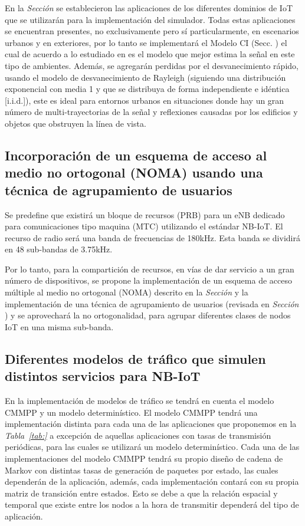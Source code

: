 En la \textit{Sección } se establecieron las aplicaciones de los diferentes dominios de IoT que se utilizarán para la implementación del simulador. Todas estas aplicaciones se encuentran presentes, no exclusivamente pero sí particularmente, en escenarios urbanos y en exteriores, por lo tanto se implementará el Modelo CI (Secc. ) el cual de acuerdo a lo estudiado en \parencite{Sun2016} es el modelo que mejor estima la señal en este tipo de ambientes. Además, se agregarán perdidas por el desvanecimiento rápido, usando el modelo de desvanecimiento de Rayleigh (siguiendo una distribución exponencial con media 1 y que se distribuya de forma independiente e idéntica [i.i.d.]), este es ideal para entornos urbanos en situaciones donde hay un gran número de multi-trayectorias de la señal y reflexiones causadas por los edificios y objetos que obstruyen la línea de vista. \newline

\subsection{Incorporación de un esquema de acceso al medio no ortogonal (NOMA) usando una técnica de agrupamiento de usuarios}

Se predefine que existirá un bloque de recursos (PRB) para un eNB dedicado para comunicaciones tipo maquina (MTC) utilizando el estándar NB-IoT. El recurso de radio será una banda de frecuencias de 180kHz. Esta banda se dividirá en 48 sub-bandas de 3.75kHz.\newline

Por lo tanto, para la compartición de recursos, en vías de dar servicio a un gran número de dispositivos, se propone la implementación de un esquema de acceso múltiple al medio no ortogonal (NOMA) descrito en la \textit{Sección } y la implementación de una técnica de agrupamiento de usuarios (revisada en \textit{Sección }) y se aprovechará la no ortogonalidad, para agrupar diferentes clases de nodos IoT en una misma sub-banda. \newline

\subsection{Diferentes modelos de tráfico que simulen distintos servicios para NB-IoT}

En la implementación de modelos de tráfico se tendrá en cuenta el modelo CMMPP y un modelo determinístico. El modelo CMMPP tendrá una implementación distinta para cada una de las aplicaciones que proponemos en la \textit{Tabla~\ref{tab:} } a excepción de aquellas aplicaciones con tasas de transmisión periódicas, para las cuales se utilizará un modelo determinístico\textit{.} Cada una de las implementaciones del modelo CMMPP tendrá su propio diseño de cadena de Markov con distintas tasas de generación de paquetes por estado, las cuales dependerán de la aplicación, además, cada implementación contará con su propia matriz de transición entre estados. Esto se debe a que la relación espacial y temporal que existe entre los nodos a la hora de transmitir dependerá del tipo de aplicación.

